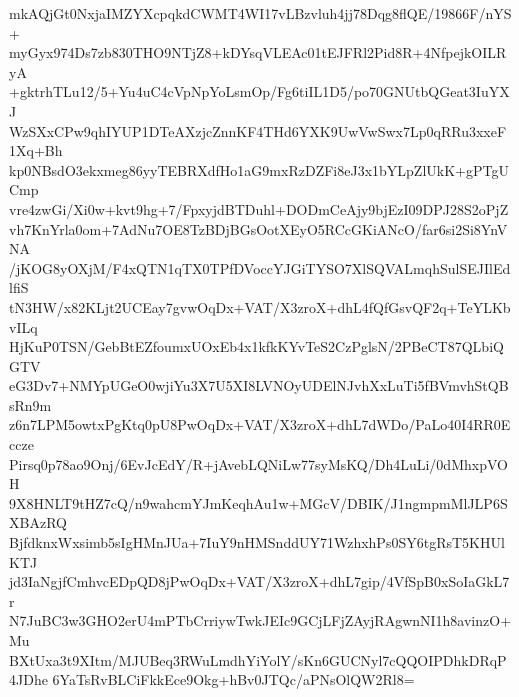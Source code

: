 mkAQjGt0NxjaIMZYXcpqkdCWMT4WI17vLBzvluh4jj78Dqg8flQE/19866F/nYS+
myGyx974Ds7zb830THO9NTjZ8+kDYsqVLEAc01tEJFRl2Pid8R+4NfpejkOILRyA
+gktrhTLu12/5+Yu4uC4cVpNpYoLsmOp/Fg6tiIL1D5/po70GNUtbQGeat3IuYXJ
WzSXxCPw9qhIYUP1DTeAXzjcZnnKF4THd6YXK9UwVwSwx7Lp0qRRu3xxeF1Xq+Bh
kp0NBsdO3ekxmeg86yyTEBRXdfHo1aG9mxRzDZFi8eJ3x1bYLpZlUkK+gPTgUCmp
vre4zwGi/Xi0w+kvt9hg+7/FpxyjdBTDuhl+DODmCeAjy9bjEzI09DPJ28S2oPjZ
vh7KnYrla0om+7AdNu7OE8TzBDjBGsOotXEyO5RCcGKiANcO/far6si2Si8YnVNA
/jKOG8yOXjM/F4xQTN1qTX0TPfDVoccYJGiTYSO7XlSQVALmqhSulSEJIlEdlfiS
tN3HW/x82KLjt2UCEay7gvwOqDx+VAT/X3zroX+dhL4fQfGsvQF2q+TeYLKbvILq
HjKuP0TSN/GebBtEZfoumxUOxEb4x1kfkKYvTeS2CzPglsN/2PBeCT87QLbiQGTV
eG3Dv7+NMYpUGeO0wjiYu3X7U5XI8LVNOyUDElNJvhXxLuTi5fBVmvhStQBsRn9m
z6n7LPM5owtxPgKtq0pU8PwOqDx+VAT/X3zroX+dhL7dWDo/PaLo40I4RR0Eccze
Pirsq0p78ao9Onj/6EvJcEdY/R+jAvebLQNiLw77syMsKQ/Dh4LuLi/0dMhxpVOH
9X8HNLT9tHZ7cQ/n9wahcmYJmKeqhAu1w+MGcV/DBIK/J1ngmpmMlJLP6SXBAzRQ
BjfdknxWxsimb5sIgHMnJUa+7IuY9nHMSnddUY71WzhxhPs0SY6tgRsT5KHUlKTJ
jd3IaNgjfCmhvcEDpQD8jPwOqDx+VAT/X3zroX+dhL7gip/4VfSpB0xSoIaGkL7r
N7JuBC3w3GHO2erU4mPTbCrriywTwkJEIc9GCjLFjZAyjRAgwnNI1h8avinzO+Mu
BXtUxa3t9XItm/MJUBeq3RWuLmdhYiYolY/sKn6GUCNyl7cQQOIPDhkDRqP4JDhe
6YaTsRvBLCiFkkEce9Okg+hBv0JTQc/aPNsOlQW2Rl8=

